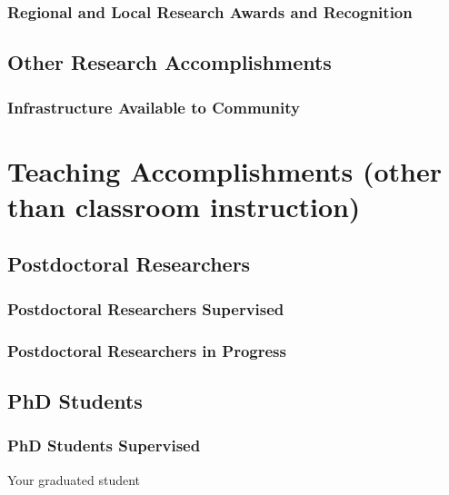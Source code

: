 \subsubsection{Regional and Local Research Awards and Recognition}

\subsection{Other Research Accomplishments}

\subsubsection{Infrastructure Available to Community}

\section{Teaching Accomplishments (other than classroom instruction)}

\subsection{Postdoctoral Researchers}
\subsubsection{Postdoctoral Researchers Supervised}
\subsubsection{Postdoctoral Researchers in Progress}

\subsection{PhD Students}

\subsubsection{PhD Students Supervised}
\begin{outerenum}
  \item Your graduated student
\end{outerenum}

